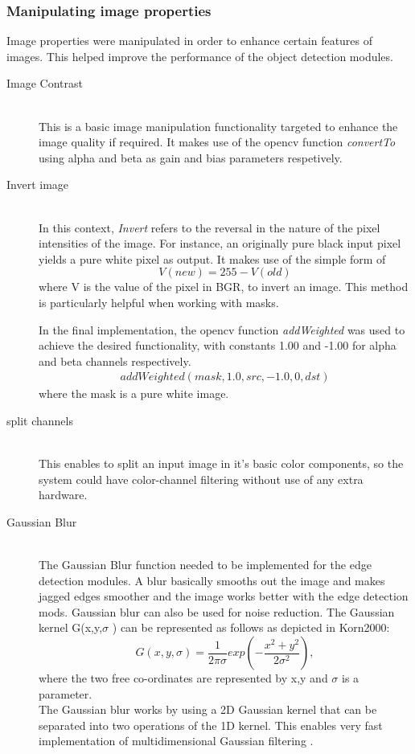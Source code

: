\subsubsection{Manipulating image properties} 
Image properties were manipulated in order to enhance certain features of images. This helped improve the performance of the object detection modules.
\begin{description}
\item[Image Contrast]\hfill \\
This is a basic image manipulation functionality targeted to enhance the image quality if required.
It makes use of the opencv function \emph{convertTo} using alpha and beta as gain and bias parameters respetively.

\item[Invert image]\hfill \\
In this context, \emph{Invert} refers to the reversal in the nature of the pixel intensities of the image.
For instance, an originally pure black input pixel yields a pure white pixel as output.
It makes use of the simple form of  
\begin{equation} V(new) = 255 - V(old)  
\end{equation} 
where V is the value of the pixel in BGR, to invert an image. 
This method is particularly helpful when working with masks.

In the final implementation, the opencv function \emph{addWeighted} was used to achieve the desired functionality, with constants 1.00 and -1.00 for alpha and beta channels respectively.
\begin{align*}
addWeighted(mask, 1.0, src, -1.0, 0, dst)
\end{align*}
where the mask is a pure white image.

\item[split channels]\hfill \\
This enables to split an input image in it's basic color components, so the system could have color-channel filtering without use of any extra hardware.

\item[Gaussian Blur]\hfill \\
The Gaussian Blur function \cite{web:gaussianBlur}  needed to be implemented for the edge detection modules. A blur basically smooths out the image and makes jagged edges smoother and the image works better with the edge detection mods. Gaussian blur can also be used for noise reduction. The Gaussian kernel G(x,y,$\sigma$ ) can be represented as follows as depicted in Korn2000:
\cite{korn2000mathematical}
\begin{equation}
G(x,y,\sigma)=\frac{1}{2\pi \sigma}exp(-\frac{x^2+y^2}{2\sigma ^2}),
\end{equation}
where the two free co-ordinates are represented by x,y and $\sigma$ is a parameter.
\\The Gaussian blur works by using a 2D Gaussian kernel that can be separated into two operations of the 1D kernel. This enables very fast implementation of multidimensional Gaussian filtering \cite{korn2000mathematical}.  


\end{description}

